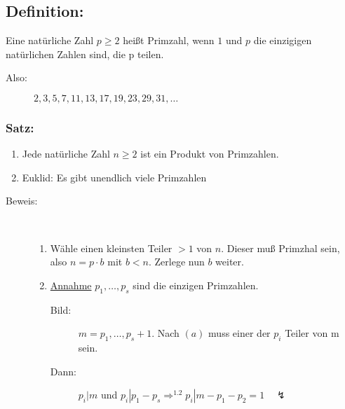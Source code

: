 \subsection{Definition:} Eine natürliche Zahl $p \geq 2$ heißt Primzahl, wenn $1$ und $p$ die einzigigen natürlichen Zahlen 
				sind, die p teilen.
\begin{description}
	\item[Also:] $2, 3, 5, 7, 11, 13, 17, 19, 23, 29, 31, \dotsc  $
\end{description}
%
%
%
\subsubsection{Satz:}

\begin{enumerate}[label={\alph*)}]
     \item Jede natürliche Zahl $n \geq 2$ ist ein Produkt von Primzahlen.
     \item Euklid: Es gibt unendlich viele Primzahlen
\end{enumerate}
\begin{description}
	\item[Beweis:] \quad \\
		\begin{enumerate}[label={\alph*)}]
			\item Wähle einen kleinsten Teiler $> 1$ von $n$. Dieser muß Primzhal sein, also $n=p \cdot b$ mit $b < 
				n$. Zerlege nun $b$ weiter.
			\item \underline{Annahme} $p_{1}, \dotsc  , p_{s}$ sind die einzigen Primzahlen. 
			\begin{description}
				\item[Bild:] $m=p_{1}, \dotsc  , p_{s}+1$. Nach $(a)$ muss einer der $p_{i}$ Teiler von m 
					      sein.
				\item[Dann:] $p_{i}|m$ und $p_{i}|p_{1}-p_{s} \Rightarrow ^{1.2} p_{i}| m-p_{1}-p_{2} = 1 
						\quad \lightning$
			\end{description}
		\end{enumerate}
\end{description}
%
%
%
